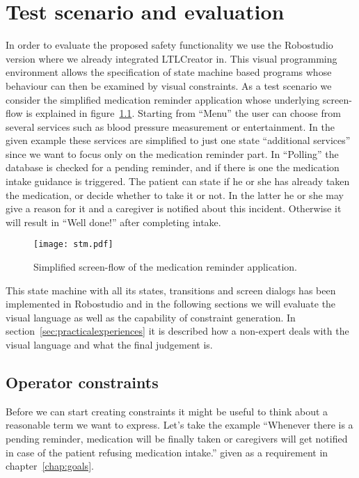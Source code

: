 \chapter{Test scenario and evaluation}
\label{chap:testscenarioandevaluation}

In order to evaluate the proposed safety functionality we use the Robostudio version where we already integrated LTLCreator in. This visual programming environment allows the specification of state machine based programs whose behaviour can then be examined by visual constraints.
As a test scenario we consider the simplified medication reminder application whose underlying screen-flow is explained in figure~\ref{fig:medicationreminder}. Starting from ``Menu'' the user can choose from several services such as blood pressure measurement or entertainment. In the given example these services are simplified to just one state ``additional services'' since we want to focus only on the medication reminder part. In ``Polling'' the database is checked for a pending reminder, and if there is one the medication intake guidance is triggered. The patient can state if he or she has already taken the medication, or decide whether to take it or not. In the latter he or she may give a reason for it and a caregiver is notified about this incident. Otherwise it will result in ``Well done!'' after completing intake.

\begin{figure}[htbp]
  \centering
  \texttt{[image: stm.pdf]}
  \caption{Simplified screen-flow of the medication reminder application.}
  \label{fig:medicationreminder}
\end{figure}

This state machine with all its states, transitions and screen dialogs has been implemented in Robostudio and in the following sections we will evaluate the visual language as well as the capability of constraint generation. In section~\ref{sec:practicalexperiences} it is described how a non-expert deals with the visual language and what the final judgement is.



\section{Operator constraints}

Before we can start creating constraints it might be useful to think about a reasonable term we want to express. Let's take the example ``Whenever there is a pending reminder, medication will be finally taken or caregivers will get notified in case of the patient refusing medication intake.'' given as a requirement in chapter~\ref{chap:goals}.

